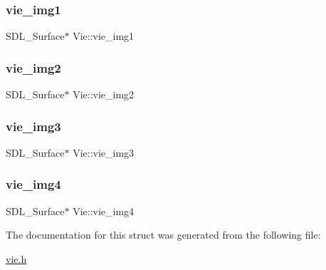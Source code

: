 \mbox{\label{structVie_ab737dfbd09f4f094fee7e7182c2610f6}} 
\subsubsection{\texorpdfstring{vie\+\_\+img1}{vie\_img1}}
{\footnotesize\ttfamily S\+D\+L\+\_\+\+Surface$\ast$ Vie\+::vie\+\_\+img1}

\mbox{\label{structVie_aaf9de52d2a9ecce1d95b3caaf0f1c144}} 
\subsubsection{\texorpdfstring{vie\+\_\+img2}{vie\_img2}}
{\footnotesize\ttfamily S\+D\+L\+\_\+\+Surface$\ast$ Vie\+::vie\+\_\+img2}

\mbox{\label{structVie_a0e8a93a5738e5b1f6a1b4e847f6e039d}} 
\subsubsection{\texorpdfstring{vie\+\_\+img3}{vie\_img3}}
{\footnotesize\ttfamily S\+D\+L\+\_\+\+Surface$\ast$ Vie\+::vie\+\_\+img3}

\mbox{\label{structVie_a03c03529f7221ba0e219e440fd44ca68}} 
\subsubsection{\texorpdfstring{vie\+\_\+img4}{vie\_img4}}
{\footnotesize\ttfamily S\+D\+L\+\_\+\+Surface$\ast$ Vie\+::vie\+\_\+img4}



The documentation for this struct was generated from the following file\+:\begin{DoxyCompactItemize}
\item 
\hyperlink{vie_8h}{vie.\+h}\end{DoxyCompactItemize}
